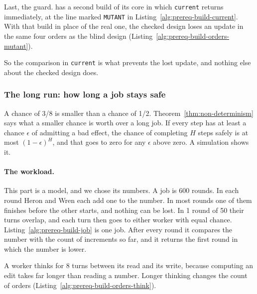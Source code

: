 
Last, the guard. \pdkernelname{} has a second build of its core in which
\texttt{current} returns immediately, at the line marked \texttt{MUTANT} in
Listing~\ref{alg:prereq-build-current}. With that build in place of the real
one, the checked design loses an update in the same four orders as the
blind design (Listing~\ref{alg:prereq-build-orders-mutant}).


So the comparison in \texttt{current} is what prevents the lost update, and
nothing else about the checked design does.

\subsubsection{The long run: how long a job stays safe}

A chance of 3/8 is smaller than a chance of 1/2.
Theorem~\ref{thm:non-determinism} says what a smaller chance is worth over
a long job. If every step has at least a chance $\epsilon$ of admitting a
bad effect, the chance of completing $H$ steps safely is at most
$(1-\epsilon)^H$, and that goes to zero for any $\epsilon$ above zero. A
simulation shows it.

\paragraph{The workload.}
This part is a model, and we chose its numbers. A job is 600 rounds. In
each round Heron and Wren each add one to the number. In most rounds one of
them finishes before the other starts, and nothing can be lost. In 1 round
of 50 their turns overlap, and each turn then goes to either worker with
equal chance. Listing~\ref{alg:prereq-build-job} is one job. After every
round it compares the number with the count of increments so far, and it
returns the first round in which the number is lower.


A worker thinks for 8 turns between its read and its write, because
computing an edit takes far longer than reading a number. Longer thinking
changes the count of orders (Listing~\ref{alg:prereq-build-orders-think}).

